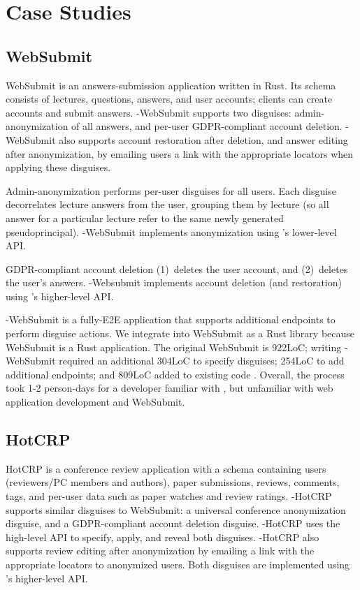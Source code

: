 \section{Case Studies}

\subsection{WebSubmit}
WebSubmit is an answers-submission application written in Rust. 
Its schema consists of lectures, questions, answers, and user accounts; 
clients can create accounts and submit answers. 
\sys-WebSubmit supports two disguises: admin-anonymization of all answers, and
per-user GDPR-compliant account deletion. \sys-WebSubmit also supports account restoration after
deletion, and answer editing after anonymization, by emailing users a link with the appropriate
locators when applying these disguises.
%

%
Admin-anonymization performs per-user disguises for all users.
Each disguise decorrelates lecture answers from the user, grouping them by lecture (so all answer
for a particular lecture refer to the same newly generated pseudoprincipal).
\sys-WebSubmit implements anonymization using \sys's lower-level API.
%

%
GDPR-compliant account deletion 
%
(1)~deletes the user account, and 
%
(2)~deletes the user's answers. 
\sys-Websubmit implements account deletion (and restoration) using \sys's higher-level API.
%

%
\sys-WebSubmit is a fully-E2E application that supports additional endpoints to perform disguise
actions. We integrate \sys into WebSubmit as a Rust library because
WebSubmit is a Rust application.
The original WebSubmit is 922LoC; writing \sys-WebSubmit required an additional 304LoC
to specify disguises; 254LoC to add additional endpoints; and 809LoC added to existing code
. Overall, the process took 1-2 person-days
for a developer familiar with \sys, but unfamiliar with web application development and
WebSubmit.

\subsection{HotCRP}
HotCRP is a conference review application with a schema containing users (reviewers/PC members and
authors), paper submissions, reviews, comments, tags, and per-user data such as paper watches and review ratings.
%
\sys-HotCRP supports similar disguises to WebSubmit: a universal conference anonymization disguise,
and a GDPR-compliant account deletion disguise.  \sys-HotCRP uses the high-level \sys API to
specify, apply, and reveal both disguises.  \sys-HotCRP also supports review editing after
anonymization by emailing a link with the appropriate locators to anonymized users. Both disguises
are implemented using \sys's higher-level API. 

